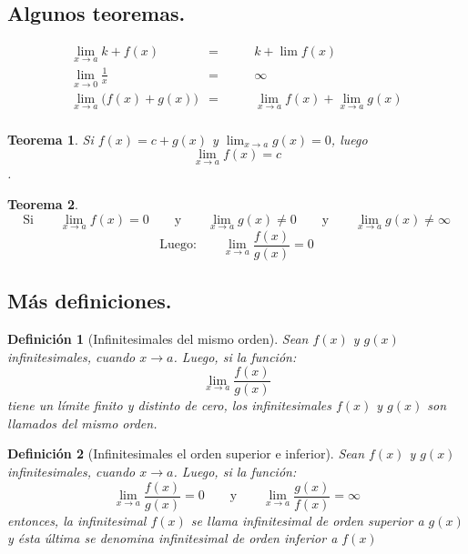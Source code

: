 \documentclass[12pt,a4paper]{article}
\newtheorem{mydef}{Definici\'on}[section]
\newtheorem{theorem}{Teorema}[section]
\begin{document}
\subsection{Algunos teoremas.}
\begin{align*}
& \lim_{x \to a} k + f(x) & =  \qquad & k + \lim f(x)& \\
& \lim_{x \to 0} \frac{1}{x} & =   \qquad  & \infty & \\
& \lim_{x \to a}\Big(f(x) + g(x)\Big) & =   \qquad  &   \lim_{x \to a} f(x) + \lim_{x  \to a} g(x)&  \\
\end{align*}




\begin{theorem}

Si \( f(x) = c+g(x) \)  y  \(  \lim_{x \to  a}g(x)=0  \), luego \[ \lim_{x \to a} f(x) = c \].

\end{theorem}


\begin{theorem}
\[\text{Si}\qquad\lim_{x \to a}f(x)=0\qquad\text{y}\qquad \lim_{x \to a}g(x)\neq0\qquad\text{y}\qquad\lim_{x \to a}g(x)\neq\infty\]
\[\text{Luego:}\qquad\lim_{x \to a}\frac{f(x)}{g(x)}=0\]
\end{theorem}

\vspace{.5cm}

\subsection{M\'as definiciones.}
\begin{mydef}[Infinitesimales del mismo orden]
Sean $f(x)$ y $g(x)$ infinitesimales, cuando $x \to a$. Luego, si la
funci\'on:
\[\lim_{x \to a}\frac{f(x)}{g(x)}\]
tiene un l\'imite finito y distinto de cero, los infinitesimales
$f(x)$ y $g(x)$ son llamados \emph{del mismo orden}.
\end{mydef}
\begin{mydef}[Infinitesimales el orden superior e inferior]
Sean $f(x)$ y $g(x)$ infinitesimales, cuando $x \to a$. Luego, si la
funci\'on:
\[\lim_{x \to a}\frac{f(x)}{g(x)}=0\qquad\text{y}\qquad\lim_{x \to a}\frac{g(x)}{f(x)}=\infty\]
entonces, la infinitesimal $f(x)$ se llama \emph{infinitesimal de
  orden superior a} $g(x)$ y \'esta \'ultima se denomina
\emph{infinitesimal de orden inferior a} $f(x)$
\end{mydef}
\end{document}
